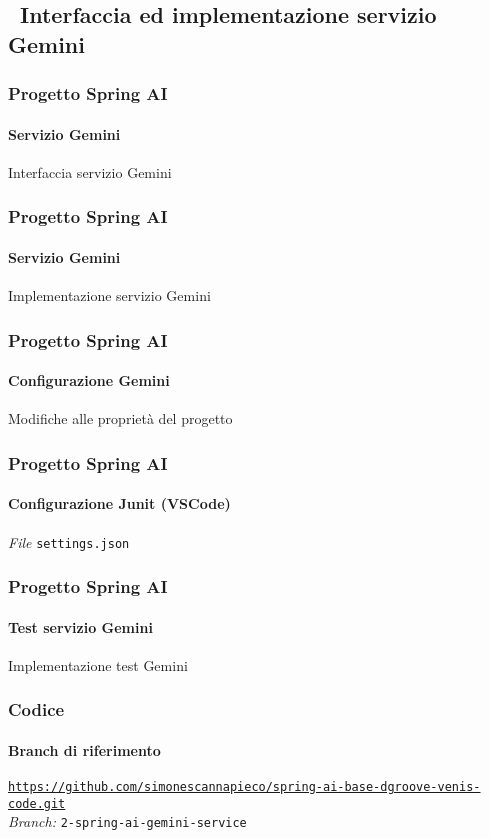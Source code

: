 \subsection{\faWrench\ Interfaccia ed implementazione servizio Gemini} %
\label{subsec:spring-ai-gemini-service-code}
%
\begin{frame}[t,fragile] \frametitle{Progetto Spring AI}
    \framesubtitle{Servizio Gemini}
        \begin{block}{Interfaccia servizio Gemini}
{\tiny}
    \end{block}
\end{frame}
%
\begin{frame}[t,fragile] \frametitle{Progetto Spring AI}
    \framesubtitle{Servizio Gemini}
        \begin{block}{Implementazione servizio Gemini}
{\tiny}
    \end{block}
\end{frame}
%
\begin{frame}[t,fragile] \frametitle{Progetto Spring AI}
    \framesubtitle{Configurazione Gemini}
        \begin{block}{Modifiche alle proprietà del progetto}
{\tiny}
    \end{block}
\end{frame}
%
\begin{frame}[t,fragile] \frametitle{Progetto Spring AI}
    \framesubtitle{Configurazione Junit (VSCode)}
        \begin{block}{\textit{File} \texttt{settings.json}}
{\tiny}
    \end{block}
\end{frame}
%
\begin{frame}[t,fragile] \frametitle{Progetto Spring AI}
    \framesubtitle{Test servizio Gemini}
        \begin{block}{Implementazione test Gemini}
{\tiny}
    \end{block}
\end{frame}
%
\begin{frame}[fragile] \frametitle{Codice}
    \framesubtitle{Branch di riferimento}
	\begin{center}
		{\scriptsize \href{https://github.com/simonescannapieco/spring-ai-base-dgroove-venis-code.git}{\texttt{https://github.com/simonescannapieco/spring-ai-base-dgroove-venis-code.git}}}\\
		\textit{Branch:} \alert{\texttt{2-spring-ai-gemini-service}}
	\end{center}
\end{frame}